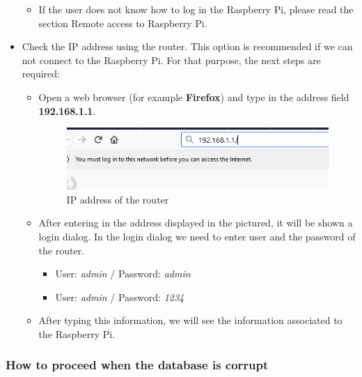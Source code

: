 \begin{itemize}
\begin{itemize}
\item If the user does not know how to log in the Raspberry Pi, please read the section Remote access to Raspberry Pi.

\end{itemize}

\item Check the IP address using the router. This option is recommended if we can not connect to the Raspberry Pi. For that purpose, the next steps are required:

\begin{itemize}

\item Open a web browser (for example \textbf{Firefox}) and type in the address field \textbf{192.168.1.1}.

\begin{figure}[H]
\begin{centering}
\includegraphics[scale=1]{IMGS/router_address.PNG}
\caption{IP address of the router \label{IP address of the router}}
\end{centering}
\end{figure} 

\item After entering in the address displayed in the pictured, it will be shown a login dialog. In the login dialog we need to enter user and the password of the router.

\begin{itemize}

\item User: \textit{admin} / Password: \textit{admin}
\item User: \textit{admin} / Password: \textit{1234}

\end{itemize}

\item After typing this information, we will see the information associated to the Raspberry Pi.

\end{itemize}

\end{itemize}

\subsubsection{How to proceed when the database is corrupt}

